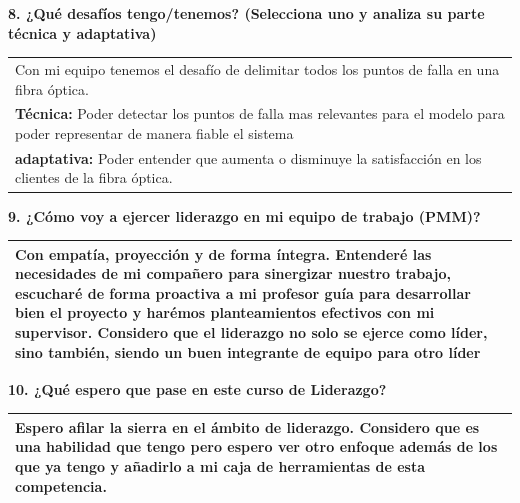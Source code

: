\documentclass[12pt, a4paper]{article}
\newcommand{\cajarespuesta}[2]{
    \vspace{0.4cm}
    \noindent \textbf{#1} \\
    \begin{tabularx}{\textwidth}{|X|}
    \hline
    #2 
    \vspace{0.2cm} \\ %
    \hline
    \end{tabularx}
}
\begin{document}
\cajarespuesta{8. ¿Qué desafíos tengo/tenemos? (Selecciona uno y analiza su parte técnica y adaptativa)}{
    Con mi equipo tenemos el desafío de delimitar todos los puntos de falla en una fibra óptica.\\
    \textbf{Técnica:} Poder detectar los puntos de falla mas relevantes para el modelo para poder representar de manera fiable el sistema 
    \\
    \textbf{adaptativa:} Poder entender que aumenta o disminuye la satisfacción en los clientes de la fibra óptica.
}

\cajarespuesta{9. ¿Cómo voy a ejercer liderazgo en mi equipo de trabajo (PMM)?}{
    Con empatía, proyección y de forma íntegra. Entenderé las necesidades de mi compañero
    para sinergizar nuestro trabajo, escucharé de forma proactiva a mi profesor guía
    para desarrollar bien el proyecto y harémos planteamientos efectivos con mi supervisor.
    Considero que el liderazgo no solo se ejerce como líder, sino también, siendo un buen integrante de equipo para otro líder
}

\cajarespuesta{10. ¿Qué espero que pase en este curso de Liderazgo?}{
   Espero afilar la sierra en el ámbito de liderazgo.
   Considero que es una habilidad que tengo pero espero ver otro enfoque además de los que ya tengo y añadirlo
   a mi caja de herramientas de esta competencia.
}
\end{document}
